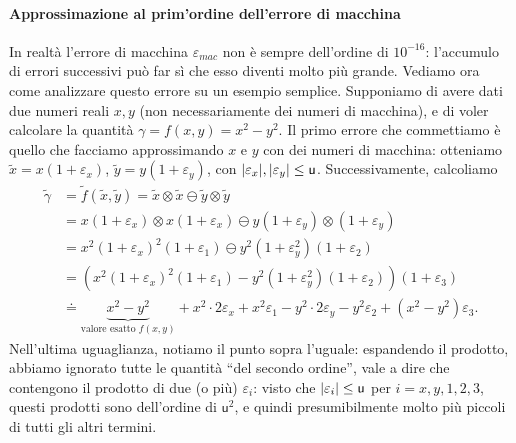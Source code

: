 \documentclass[a4paper]{report}
\DeclarePairedDelimiter{\abs}{\lvert}{\rvert}
\theoremstyle{definiton}
\theoremstyle{remark}
\begin{document}
\paragraph{Approssimazione al prim'ordine dell'errore di macchina}
In realtà l'errore di macchina $\varepsilon_{mac}$ non è sempre dell'ordine di $10^{-16}$: l'accumulo di errori successivi può far sì che esso diventi molto più grande. Vediamo ora come analizzare questo errore su un esempio semplice. Supponiamo di avere dati due numeri reali $x,y$ (non necessariamente dei numeri di macchina), e di voler calcolare la quantità $\gamma = f(x,y) = x^2 - y^2$. Il primo errore che commettiamo è quello che facciamo approssimando $x$ e $y$ con dei numeri di macchina: otteniamo $\tilde{x} = x(1+\varepsilon_x)$, $\tilde{y} = y(1+\varepsilon_y)$, con $\abs{\varepsilon_x},\abs{\varepsilon_y} \leq \mathsf{u}$. Successivamente, calcoliamo
\begin{align*}
\tilde{\gamma} &= \tilde{f}(\tilde{x}, \tilde{y}) = \tilde{x} \otimes \tilde{x} \ominus \tilde{y} \otimes \tilde{y} \\
&= x(1+\varepsilon_x) \otimes x(1+\varepsilon_x) \ominus y(1+\varepsilon_y) \otimes (1+\varepsilon_y)\\
&= x^2(1+\varepsilon_x)^2(1+\varepsilon_1) \ominus y^2(1+\varepsilon_y^2)(1+\varepsilon_2)\\
&= \left( x^2(1+\varepsilon_x)^2(1+\varepsilon_1) - y^2(1+\varepsilon_y^2)(1+\varepsilon_2) \right)(1+\varepsilon_3) \\
& \doteq \underbrace{x^2-y^2}_{\text{valore esatto $f(x,y)$}} {}+{} x^2 \cdot 2\varepsilon_x + x^2 \varepsilon_1 - y^2 \cdot 2\varepsilon_y - y^2\varepsilon_2 + (x^2-y^2)\varepsilon_3.
\end{align*}
Nell'ultima uguaglianza, notiamo il punto sopra l'uguale: espandendo il prodotto, abbiamo ignorato tutte le quantità ``del secondo ordine'', vale a dire che contengono il prodotto di due (o più) $\varepsilon_i$: visto che $\abs{\varepsilon_i} \leq \mathsf{u}$ per $i=x,y,1,2,3$, questi prodotti sono dell'ordine di $\mathsf{u}^2$, e quindi presumibilmente molto più piccoli di tutti gli altri termini.
\end{document}
